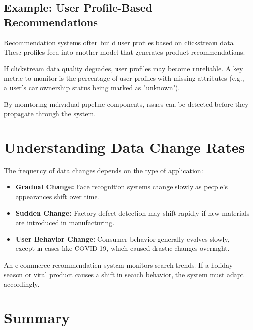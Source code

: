 \documentclass[12pt,openany]{book}
\begin{document}
\subsection{Example: User Profile-Based Recommendations}

Recommendation systems often build user profiles based on clickstream data. These profiles feed into another model that generates product recommendations.

\begin{examplebox}
   If clickstream data quality degrades, user profiles may become unreliable. A key metric to monitor is the percentage of user profiles with missing attributes (e.g., a user's car ownership status being marked as "unknown").
\end{examplebox}

By monitoring individual pipeline components, issues can be detected before they propagate through the system.



\section{Understanding Data Change Rates}

The frequency of data changes depends on the type of application:

\begin{itemize}
    \item \textbf{Gradual Change:} Face recognition systems change slowly as people's appearances shift over time.
    \item \textbf{Sudden Change:} Factory defect detection may shift rapidly if new materials are introduced in manufacturing.
    \item \textbf{User Behavior Change:} Consumer behavior generally evolves slowly, except in cases like COVID-19, which caused drastic changes overnight.
\end{itemize}

\begin{examplebox}
   An e-commerce recommendation system monitors search trends. If a holiday season or viral product causes a shift in search behavior, the system must adapt accordingly.
\end{examplebox}



\section{Summary}
\end{document}

